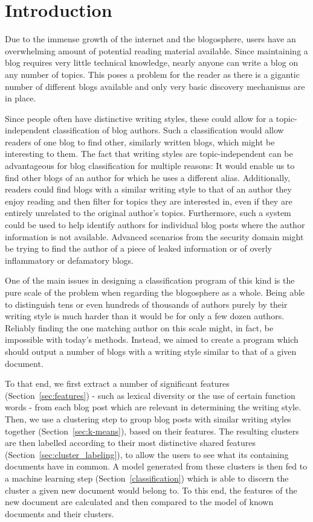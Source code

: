 
\section{Introduction}
\label{sec:introduction}

Due to the immense growth of the internet and the blogosphere, users have an overwhelming amount of potential reading material available.
Since maintaining a blog requires very little technical knowledge, nearly anyone can write a blog on any number of topics.
This poses a problem for the reader as there is a gigantic number of different blogs available and only very basic discovery mechanisms are in place.


Since people often have distinctive writing styles, these could allow for a topic-independent classification of blog authors.
Such a classification would allow readers of one blog to find other, similarly written blogs, which might be interesting to them.
The fact that writing styles are topic-independent can be advantageous for blog classification for multiple reasons: It would enable us to find other blogs of an author for which he uses a different alias.
Additionally, readers could find blogs with a similar writing style to that of an author they enjoy reading and then filter for topics they are interested in, even if they are entirely unrelated to the original author's topics.
Furthermore, such a system could be used to help identify authors for individual blog posts where the author information is not available.
Advanced scenarios from the security domain might be trying to find the author of a piece of leaked information or of overly inflammatory or defamatory blogs.


One of the main issues in designing a classification program of this kind is the pure scale of the problem when regarding the blogosphere as a whole.
Being able to distinguish tens or even hundreds of thousands of authors purely by their writing style is much harder than it would be for only a few dozen authors.
Reliably finding the one matching author on this scale might, in fact, be impossible with today's methods.
Instead, we aimed to create a program which should output a number of blogs with a writing style similar to that of a given document.


To that end, we first extract a number of significant features (Section~\ref{sec:features}) - such as lexical diversity or the use of certain function words - from each blog post which are relevant in determining the writing style.
Then, we use a clustering step to group blog posts with similar writing styles together (Section~\ref{sec:k-means}), based on their features.
The resulting clusters are then labelled according to their most distinctive shared features (Section~\ref{sec:cluster_labeling}), to allow the users to see what its containing documents have in common.
A model generated from these clusters is then fed to a machine learning step (Section~\ref{classification}) which is able to discern the cluster a given new document would belong to.
To this end, the features of the new document are calculated and then compared to the model of known documents and their clusters.


